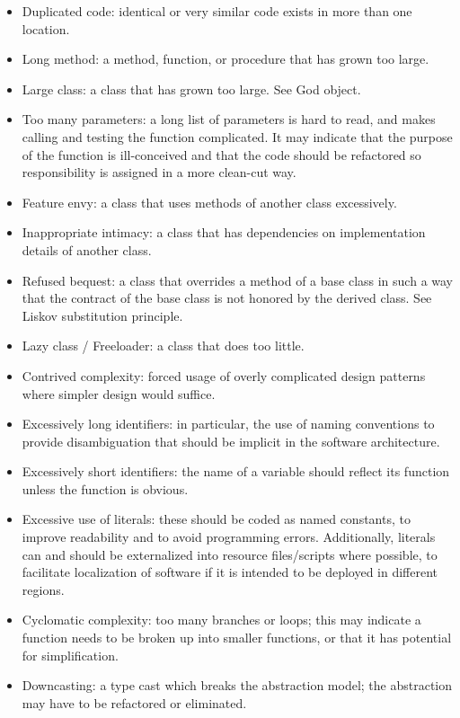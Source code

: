 	\begin{itemize}
\item Duplicated code: identical or very similar code exists in more than one location.
\item Long method: a method, function, or procedure that has grown too large.
\item Large class: a class that has grown too large. See God object.
\item Too many parameters: a long list of parameters is hard to read, and makes calling and testing the function complicated. It may indicate that the purpose of the function is ill-conceived and that the code should be refactored so responsibility is assigned in a more clean-cut way.
\item Feature envy: a class that uses methods of another class excessively.
\item Inappropriate intimacy: a class that has dependencies on implementation details of another class.
\item Refused bequest: a class that overrides a method of a base class in such a way that the contract of the base class is not honored by the derived class. See Liskov substitution principle.
\item Lazy class / Freeloader: a class that does too little.
\item Contrived complexity: forced usage of overly complicated design patterns where simpler design would suffice.
\item Excessively long identifiers: in particular, the use of naming conventions to provide disambiguation that should be implicit in the software architecture.
\item Excessively short identifiers: the name of a variable should reflect its function unless the function is obvious.
\item Excessive use of literals: these should be coded as named constants, to improve readability and to avoid programming errors. Additionally, literals can and should be externalized into resource files/scripts where possible, to facilitate localization of software if it is intended to be deployed in different regions.
\item Cyclomatic complexity: too many branches or loops; this may indicate a function needs to be broken up into smaller functions, or that it has potential for simplification.
\item Downcasting: a type cast which breaks the abstraction model; the abstraction may have to be refactored or eliminated.
	\end{itemize}

